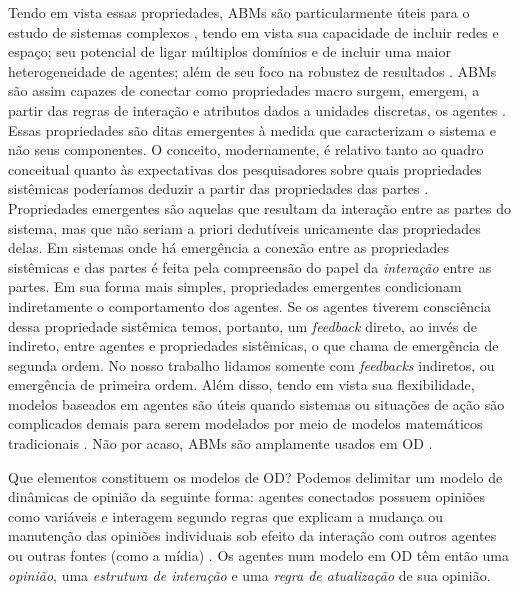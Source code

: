   Tendo em vista essas propriedades, ABMs são particularmente úteis para o
  estudo de sistemas complexos \cite{wilensky2015introduction}, tendo em vista
  sua capacidade de incluir redes e espaço; seu potencial de ligar múltiplos
  domínios e de incluir uma maior heterogeneidade de agentes; além de seu foco
  na robustez de resultados \cite{de2014agent,wilensky2015introduction}. ABMs
  são assim capazes de conectar como propriedades macro surgem, emergem, a
  partir das regras de interação e atributos dados a unidades discretas, os
  agentes \cite{north2007managing}. Essas propriedades são ditas emergentes à
  medida que caracterizam o sistema e não seus componentes. O conceito,
  modernamente, é relativo tanto ao quadro conceitual quanto às expectativas dos
  pesquisadores sobre quais propriedades sistêmicas poderíamos deduzir a partir
  das propriedades das partes \cite{epstein2006generative}. Propriedades
  emergentes são aquelas que resultam da interação entre as partes do sistema,
  mas que não seriam a priori dedutíveis unicamente das propriedades delas. Em
  sistemas onde há emergência a conexão entre as propriedades sistêmicas e das
  partes é feita pela compreensão do papel da \textit{interação} entre as
  partes. Em sua forma mais simples, propriedades emergentes condicionam
  indiretamente o comportamento dos agentes. Se os agentes tiverem consciência
  dessa propriedade sistêmica temos, portanto, um \textit{feedback} direto, ao
  invés de indireto, entre agentes e propriedades sistêmicas, o que
   chama de emergência de segunda ordem. No nosso
  trabalho lidamos somente com \textit{feedbacks} indiretos, ou emergência de
  primeira ordem. Além disso, tendo em vista sua flexibilidade, modelos baseados
  em agentes são úteis quando sistemas ou situações de ação são complicados
  demais para serem modelados por meio de modelos matemáticos tradicionais
  \cite{kollman2003computational}. Não por acaso, ABMs são amplamente usados em
  OD \cite{castellano2012social,flache2017}.

  
  Que elementos constituem os modelos de OD? Podemos delimitar um modelo de
  dinâmicas de opinião da seguinte forma: agentes conectados possuem opiniões
  como variáveis e interagem segundo regras que explicam a mudança ou manutenção
  das opiniões individuais sob efeito da interação com outros agentes ou outras
  fontes (como a mídia) \cite{sirbu2017opinion}. Os agentes num modelo em OD têm
  então uma \textit{opinião}, uma \textit{estrutura de interação} e uma
  \textit{regra de atualização} de sua opinião.


